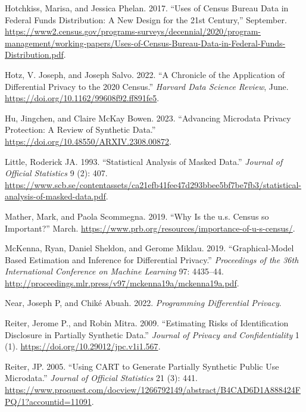 \documentclass[
]{urban-formatting}
\newlength{\cslhangindent}
\newlength{\cslentryspacingunit} %
\newenvironment{CSLReferences}[2] %
 {%
  \setlength{\parindent}{0pt}
  \ifodd #1
  \let\oldpar\par
  \def\par{\hangindent=\cslhangindent\oldpar}
  \fi
  \setlength{\parskip}{#2\cslentryspacingunit}
 }%
 {}
\begin{document}
\begin{CSLReferences}{1}{0}
\leavevmode{}%
Hotchkiss, Marisa, and Jessica Phelan. 2017. {``Uses of Census Bureau
Data in Federal Funds Distribution: A New Design for the 21st
Century,''} September.
\url{https://www2.census.gov/programs-surveys/decennial/2020/program-management/working-papers/Uses-of-Census-Bureau-Data-in-Federal-Funds-Distribution.pdf}.

\leavevmode{}%
Hotz, V. Joseph, and Joseph Salvo. 2022. {``A Chronicle of the
Application of Differential Privacy to the 2020 Census.''} \emph{Harvard
Data Science Review}, June.
\url{https://doi.org/10.1162/99608f92.ff891fe5}.

\leavevmode{}%
Hu, Jingchen, and Claire McKay Bowen. 2023. {``Advancing Microdata
Privacy Protection: A Review of Synthetic Data.''}
\url{https://doi.org/10.48550/ARXIV.2308.00872}.

\leavevmode{}%
Little, Roderick JA. 1993. {``Statistical Analysis of Masked Data.''}
\emph{Journal of Official Statistics} 9 (2): 407.
\url{https://www.scb.se/contentassets/ca21efb41fee47d293bbee5bf7be7fb3/statistical-analysis-of-masked-data.pdf}.

\leavevmode{}%
Mather, Mark, and Paola Scommegna. 2019. {``Why Is the u.s. Census so
Important?''} March.
\url{https://www.prb.org/resources/importance-of-u-s-census/}.

\leavevmode{}%
McKenna, Ryan, Daniel Sheldon, and Gerome Miklau. 2019.
{``Graphical-Model Based Estimation and Inference for Differential
Privacy.''} \emph{Proceedings of the 36th International Conference on
Machine Learning} 97: 4435--44.
\url{http://proceedings.mlr.press/v97/mckenna19a/mckenna19a.pdf}.

\leavevmode{}%
Near, Joseph P, and Chiké Abuah. 2022. \emph{Programming Differential
Privacy}.

\leavevmode{}%
Reiter, Jerome P., and Robin Mitra. 2009. {``Estimating Risks of
Identification Disclosure in Partially Synthetic Data.''} \emph{Journal
of Privacy and Confidentiality} 1 (1).
\url{https://doi.org/10.29012/jpc.v1i1.567}.

\leavevmode{}%
Reiter, JP. 2005. {``Using CART to Generate Partially Synthetic Public
Use Microdata.''} \emph{Journal of Official Statistics} 21 (3): 441.
\url{https://www.proquest.com/docview/1266792149/abstract/B4CAD6D1A888424FPQ/1?accountid=11091}.


\end{CSLReferences}
\end{document}
